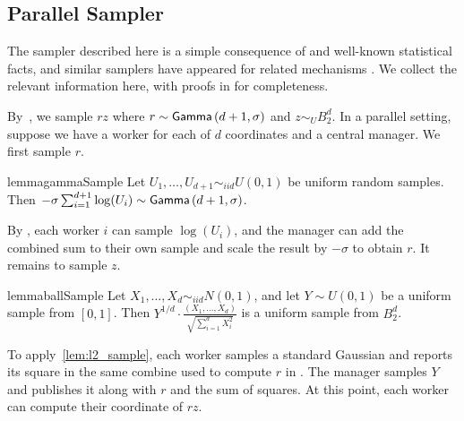 \subsection{Parallel Sampler}
\label{subsec:l2_sampler}
The sampler described here is a simple consequence of  and well-known statistical facts, and similar samplers have appeared for related mechanisms \cite{YRUF14, SU16}. We collect the relevant information here, with proofs in  for completeness.

By~, we sample $rz$ where $r \sim \mathsf{Gamma}\left(d+1, \sigma\right)$ and $z \sim_U B_2^d$. In a parallel setting, suppose we have a worker for each of $d$ coordinates and a central manager. We first sample $r$.

\begin{restatable}{lemma}{gammaSample}
\label{lem:gamma_sample}
    Let $U_1, \ldots, U_{d+1} \sim_{iid} U(0,1)$ be uniform random samples. Then $-\sigma\sum_{i=1}^{d+1} \log(U_i) \sim \mathsf{Gamma}\left(d+1, \sigma\right)$.
\end{restatable}


By , each worker $i$ can sample $\log(U_i)$, and the manager can add the combined sum to their own sample and scale the result by $-\sigma$ to obtain $r$. It remains to sample $z$.

\begin{restatable}{lemma}{ballSample}
\label{lem:l2_sample}
    Let $X_1, \ldots, X_d \sim_{iid} N(0,1)$, and let $Y \sim U(0,1)$ be a uniform sample from $[0,1]$. Then $Y^{1/d} \cdot \frac{(X_1, \ldots, X_d)}{\sqrt{\sum_{i=1}^d X_i^2}}$ is a uniform sample from $B_2^d$. 
\end{restatable}

To apply~\cref{lem:l2_sample}, each worker samples a standard Gaussian and reports its square in the same combine used to compute $r$ in . The manager samples $Y$ and publishes it along with $r$ and the sum of squares. At this point, each worker can compute their coordinate of $rz$.